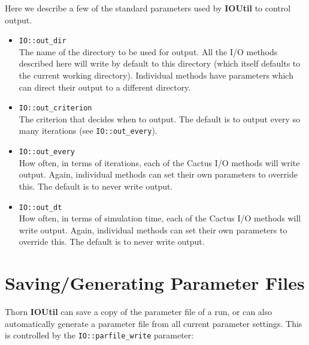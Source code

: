 \documentclass{article}
\begin{document}
Here we describe a few of the standard parameters used by {\bf IOUtil} to
control output.
\begin{itemize}

  \item{\tt IO::out\_dir}\\
    The name of the directory to be used for output. All the I/O methods
    described here will write by default to this directory (which itself
    defaults to the current working directory). Individual methods have
    parameters which can direct their output to a different directory.

  \item{\tt IO::out\_criterion}\\
    The criterion that decides when to output.  The default is to
    output every so many iterations (see {\tt IO::out\_every}).

  \item{\tt IO::out\_every}\\
    How often, in terms of iterations, each of the Cactus I/O methods
    will write
    output. Again, individual methods can set their own parameters to override
    this. The default is to never write output.

  \item{\tt IO::out\_dt}\\
    How often, in terms of simulation time, each of the Cactus I/O
    methods will write output.  Again, individual methods can set
    their own parameters to override this.  The default is to never
    write output.
\end{itemize}


\section{Saving/Generating Parameter Files}

Thorn {\bf IOUtil} can save a copy of the parameter file of a run, or can also
automatically generate a parameter file from all current parameter settings.
This is controlled by the {\tt IO::parfile\_write} parameter:
\end{document}
